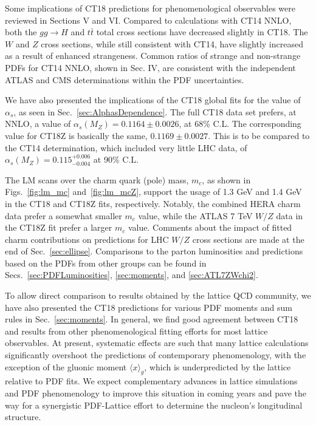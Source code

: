 Some implications of CT18 predictions for phenomenological observables
were reviewed in Sections V and VI.
Compared to calculations with CT14 NNLO, both the $gg \rightarrow H$ and $t\bar t$  total
cross sections have decreased slightly in CT18. The $W$ and $Z$
cross sections, while still consistent with CT14, have slightly increased as a result of enhanced strangeness. Common ratios of
strange and non-strange PDFs for CT14 NNLO, shown in Sec. IV, are consistent with
the independent
ATLAS and CMS determinations within the PDF uncertainties.

We have also presented the implications of the CT18 global fits for the value of $\alpha_s$, as seen in Sec.~\ref{sec:AlphasDependence}.   
The full CT18 data set prefers, at NNLO, a value of $\alpha_s(M_Z)\! =\! 0.1164\! \pm\! 0.0026$, at 68\% C.L. The corresponding value for CT18Z is basically the same, $0.1169\pm0.0027$.
This is to be compared to the CT14 determination, which included very little LHC data, of $\alpha_s(M_Z)\! =\! 0.115^{+0.006}_{-0.004}$ at 90\% C.L.

The LM scans over the charm quark (pole) mass, $m_c$, as shown in Figs.~\ref{fig:lm_mc} and~\ref{fig:lm_mcZ}, support the usage of 1.3 GeV and 1.4 GeV in the CT18 and CT18Z fits,
respectively. Notably, the combined HERA charm data prefer a somewhat smaller $m_c$ value, while the ATLAS 7 TeV $W/Z$ data in the CT18Z fit prefer a larger $m_c$ value. Comments about the impact of fitted charm contributions on predictions for LHC $W/Z$ cross sections are made at the end of Sec.~\ref{sec:ellipse}.
Comparisons to the parton luminosities and predictions based on the PDFs from other groups can be found in Secs.~\ref{sec:PDFLuminosities}, \ref{sec:moments}, and \ref{sec:ATL7ZWchi2}.

To allow direct comparison to results obtained by the lattice QCD community, we have also presented the CT18 predictions for various PDF moments and sum rules in Sec.~\ref{sec:moments}.
In general, we find good agreement between CT18 and results from other phenomenological fitting efforts for most lattice observables.  At present, systematic
effects are such that many lattice calculations significantly overshoot the predictions of contemporary phenomenology, with the exception of the gluonic moment $\langle x \rangle_g$, which
is underpredicted by the lattice relative to PDF fits.  We expect complementary advances in lattice simulations and PDF phenomenology to improve this situation
in coming years and pave the way for a synergistic PDF-Lattice effort \cite{Hobbs:2019gob,Lin:2017snn} to determine the nucleon's longitudinal structure.

